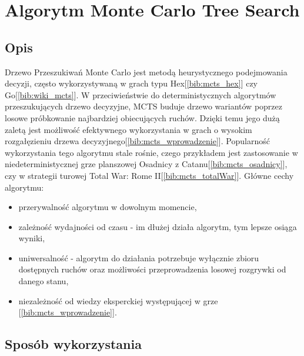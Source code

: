 \section{Algorytm Monte Carlo Tree Search}
\label{sec:mcts}

\subsection{Opis}

Drzewo Przeszukiwań Monte Carlo jest metodą heurystycznego podejmowania decyzji, często wykorzystywaną w grach typu Hex[\ref{bib:mcts_hex}] czy Go[\ref{bib:wiki_mcts}]. W przeciwieństwie do deterministycznych algorytmów przeszukujących drzewo decyzyjne, MCTS buduje drzewo wariantów poprzez losowe próbkowanie najbardziej obiecujących ruchów. Dzięki temu jego dużą zaletą jest możliwość efektywnego wykorzystania w grach o wysokim rozgałęzieniu drzewa decyzyjnego[\ref{bib:mcts_wprowadzenie}]. Popularność wykorzystania tego algorytmu stale rośnie, czego przykładem jest zastosowanie w niedeterministycznej grze planszowej Osadnicy z Catanu[\ref{bib:mcts_osadnicy}], czy w strategii turowej Total War: Rome II[\ref{bib:mcts_totalWar}]. Główne cechy algorytmu:
\begin{itemize}
	\item przerywalność algorytmu w dowolnym momencie,
	\item zależność wydajności od czasu - im dłużej działa algorytm, tym lepsze osiąga wyniki,
	\item uniwersalność - algorytm do działania potrzebuje wyłącznie zbioru dostępnych ruchów oraz możliwości przeprowadzenia losowej rozgrywki od danego stanu,
	\item niezależność od wiedzy eksperckiej występującej w grze [\ref{bib:mcts_wprowadzenie}].
\end{itemize}

\subsection{Sposób wykorzystania}

